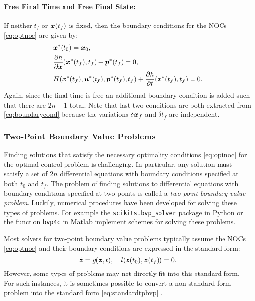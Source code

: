 \paragraph{Free Final Time and Free Final State:} If neither $t_f$ or $\bm{x}(t_f)$ is fixed, then the boundary conditions for the NOCs \eqref{eq:optnoc} are given by:
\begin{equation*}
\begin{split}
&\bm{x}^*(t_0) = \bm{x}_0, \\
&\frac{\partial h }{\partial \bm{x}} (\bm{x}^* (t_f), t_f) - \bm{p}^*(t_f) = 0, \\
&H(\bm{x}^*(t_f), \bm{u}^*(t_f), \bm{p}^*(t_f), t_f) +\frac{\partial{h}}{\partial{t}}(\bm{x}^*(t_f), t_f) = 0.  
\end{split}
\end{equation*}
Again, since the final time is free an additional boundary condition is added such that there are $2n+1$ total. Note that last two conditions are both extracted from \eqref{eq:boundarycond} because the variations $\delta \bm{x}_f$ and $\delta t_f$ are independent.

\subsubsection{Two-Point Boundary Value Problems}
Finding solutions that satisfy the necessary optimality conditions \eqref{eq:optnoc} for the optimal control problem is challenging. In particular, any solution must satisfy a set of $2n$ differential equations with boundary conditions specified at both $t_0$ and $t_f$. The problem of finding solutions to differential equations with boundary conditions specified at two points is called a \textit{two-point boundary value problem}.
Luckily, numerical procedures have been developed for solving these types of problems. For example the \texttt{scikits.bvp\_solver} package in Python or the function \texttt{bvp4c} in Matlab implement schemes for solving these problems.

Most solvers for two-point boundary value problems typically assume the NOCs \eqref{eq:optnoc} and their boundary conditions are expressed in the standard form:
\begin{equation} \label{eq:standardtpbvp}
\dot{\bm{z}} = g(\bm{z}, t), \quad l(\bm{z}(t_0), \bm{z}(t_f)) = 0.
\end{equation}
However, some types of problems may not directly fit into this standard form. For such instances, it is sometimes possible to convert a non-standard form problem into the standard form \eqref{eq:standardtpbvp} \cite{AscherRussel1981}.

